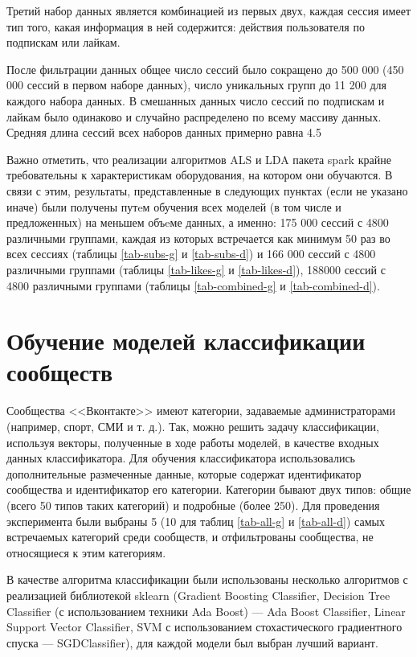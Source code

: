 \documentclass[times,specification,annotation]{itmo-student-thesis}
\begin{document}
Третий набор данных является комбинацией из первых двух, каждая сессия имеет тип того, какая информация в ней содержится: действия пользователя по подпискам или лайкам. 

После фильтрации данных общее число сессий было сокращено до 500 000 (450 000 сессий в первом наборе данных), число уникальных групп до 11 200 для каждого набора данных. В смешанных данных число сессий по подпискам и лайкам было одинаково и случайно распределено по всему массиву данных. Средняя длина сессий всех наборов данных примерно равна 4.5

Важно отметить, что реализации алгоритмов ALS и LDA пакета spark крайне требовательны к характеристикам оборудования, на котором они обучаются. В связи с этим, результаты, представленные в следующих пунктах (если не указано иначе) были получены путeм обучения всех моделей (в том числе и предложенных) на меньшем объeме данных, а именно: 175 000 сессий с 4800 различными группами, каждая из которых встречается как минимум 50 раз во всех сессиях (таблицы  \ref{tab-subs-g} и \ref{tab-subs-d}) и 166 000 сессий с 4800 различными группами (таблицы \ref{tab-likes-g} и \ref{tab-likes-d}), 188000 сессий с 4800 различными группами (таблицы \ref{tab-combined-g} и \ref{tab-combined-d}). 

\section{Обучение моделей классификации сообществ}\label{sec:class}

Сообщества <<Вконтакте>> имеют категории, задаваемые администраторами
(например, спорт, СМИ и т. д.). Так, можно решить задачу классификации,
используя векторы, полученные в ходе работы моделей, в качестве входных
данных классификатора.  Для обучения классификатора использовались дополнительные размеченные данные, которые содержат идентификатор сообщества и идентификатор его категории. Категории бывают двух типов: общие (всего 50 типов таких категорий) и подробные (более 250). Для проведения эксперимента были выбраны 5 (10 для таблиц  \ref{tab-all-g} и  \ref{tab-all-d}) самых встречаемых категорий среди сообществ, и отфильтрованы сообщества, не относящиеся к этим категориям.

В качестве алгоритма классификации были использованы несколько алгоритмов с реализацией библиотекой sklearn (Gradient Boosting Classifier, Decision Tree Classifier (с использованием техники Ada Boost) --- Ada Boost Classifier, Linear Support Vector Classifier, SVM с использованием стохастического градиентного спуска --- SGDClassifier), для каждой модели был выбран лучший вариант. 
\end{document}
